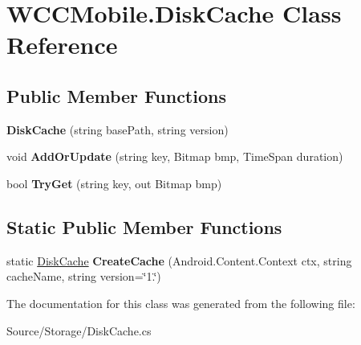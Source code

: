 \hypertarget{class_w_c_c_mobile_1_1_disk_cache}{}\section{W\+C\+C\+Mobile.\+Disk\+Cache Class Reference}
\label{class_w_c_c_mobile_1_1_disk_cache}
\subsection*{Public Member Functions}
\begin{DoxyCompactItemize}
\item 
{\bfseries Disk\+Cache} (string base\+Path, string version)\hypertarget{class_w_c_c_mobile_1_1_disk_cache_a40a1b6ff0702cfb23d2185c51e69af35}{}\label{class_w_c_c_mobile_1_1_disk_cache_a40a1b6ff0702cfb23d2185c51e69af35}

\item 
void {\bfseries Add\+Or\+Update} (string key, Bitmap bmp, Time\+Span duration)\hypertarget{class_w_c_c_mobile_1_1_disk_cache_a92e72251d1a9ed2dac403931606da23b}{}\label{class_w_c_c_mobile_1_1_disk_cache_a92e72251d1a9ed2dac403931606da23b}

\item 
bool {\bfseries Try\+Get} (string key, out Bitmap bmp)\hypertarget{class_w_c_c_mobile_1_1_disk_cache_a994805d57caa75e7b2b7056e61c85cbd}{}\label{class_w_c_c_mobile_1_1_disk_cache_a994805d57caa75e7b2b7056e61c85cbd}

\end{DoxyCompactItemize}
\subsection*{Static Public Member Functions}
\begin{DoxyCompactItemize}
\item 
static \hyperlink{class_w_c_c_mobile_1_1_disk_cache}{Disk\+Cache} {\bfseries Create\+Cache} (Android.\+Content.\+Context ctx, string cache\+Name, string version=\char`\"{}1.\char`\"{})\hypertarget{class_w_c_c_mobile_1_1_disk_cache_a8fdcd5e0485803abcd5bffc663cc03ef}{}\label{class_w_c_c_mobile_1_1_disk_cache_a8fdcd5e0485803abcd5bffc663cc03ef}

\end{DoxyCompactItemize}


The documentation for this class was generated from the following file\+:\begin{DoxyCompactItemize}
\item 
Source/\+Storage/Disk\+Cache.\+cs\end{DoxyCompactItemize}
